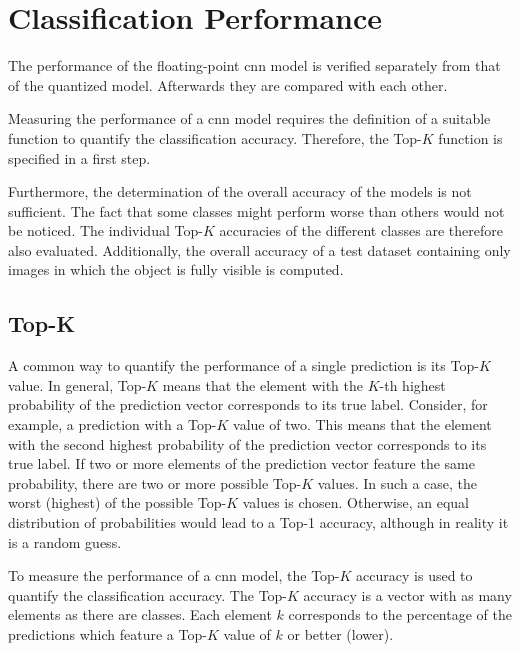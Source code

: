 \section{Classification Performance}
\label{sec:verification_and_benchmark:classification_performance}

The performance of the floating-point \acrshort{cnn} model is verified separately from that of the quantized model.
Afterwards they are compared with each other.

Measuring the performance of a \acrshort{cnn} model requires the definition of a suitable function to quantify the classification accuracy.
Therefore, the Top-$K$ function is specified in a first step.

Furthermore, the determination of the overall accuracy of the models is not sufficient.
The fact that some classes might perform worse than others would not be noticed.
The individual Top-$K$ accuracies of the different classes are therefore also evaluated.
Additionally, the overall accuracy of a test dataset containing only images in which the object is fully visible is computed.

\subsection{Top-K}
\label{subsec:verification_and_benchmark:classification_performance:topk}

A common way to quantify the performance of a single prediction is its Top-$K$ value.
In general, Top-$K$ means that the element with the $K$-th highest probability of the prediction vector corresponds to its true label.
Consider, for example, a prediction with a Top-$K$ value of two.
This means that the element with the second highest probability of the prediction vector corresponds to its true label.
If two or more elements of the prediction vector feature the same probability, there are two or more possible Top-$K$ values.
In such a case, the worst (highest) of the possible Top-$K$ values is chosen.
Otherwise, an equal distribution of probabilities would lead to a Top-1 accuracy, although in reality it is a random guess.

To measure the performance of a \acrshort{cnn} model, the Top-$K$ accuracy is used to quantify the classification accuracy.
The Top-$K$ accuracy is a vector with as many elements as there are classes.
Each element $k$ corresponds to the percentage of the predictions which feature a Top-$K$ value of $k$ or better (lower).


